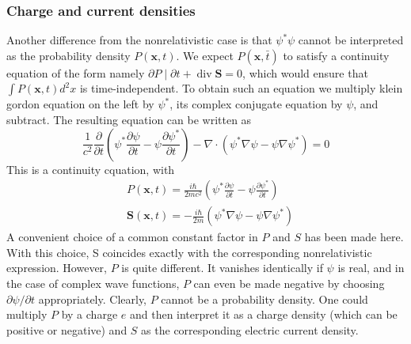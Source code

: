  \subsubsection{Charge and current densities}
 Another difference from the nonrelativistic case is that $\psi^{*} \psi$ cannot be interpreted as the probability density $P(\mathbf{x}, t) .$ We expect $P(\mathbf{x}, \bar{t})$ to satisfy a continuity equation of the form  namely $\partial P \mid \partial t+\operatorname{div} \mathbf{S}=0$, which would ensure that $\int P(\mathbf{x}, t) d^{2} x$ is time-independent. To obtain such an equation we multiply klein gordon equation on the left by $\psi^{*}$, its complex conjugate equation by $\psi$, and subtract.
 The resulting equation can be written as
 $$
 \frac{1}{c^{2}} \frac{\partial}{\partial t}\left(\psi^{*} \frac{\partial \psi}{\partial t}-\psi \frac{\partial \psi^{*}}{\partial t}\right)-\nabla \cdot\left(\psi^{*} \nabla \psi-\psi \nabla \psi^{*}\right)=0
 $$
 This is a continuity cquation, with
 $$
 \begin{aligned}
 &P(\mathbf{x}, t)=\frac{i \hbar}{2 m c^{2}}\left(\psi^{*} \frac{\partial \psi}{\partial t}-\psi \frac{\partial \psi^{*}}{\partial t}\right) \\
 &{\mathbf{S}(\mathbf{x}, t)=-\frac{i \hbar}{2 m}\left(\psi^{*} \nabla \psi-\psi \nabla \psi^{*}\right)}
 \end{aligned}
 $$
 A convenient choice of a common constant factor in $P$ and $S$ has been made here. With this choice, S coincides exactly with the corresponding nonrelativistic expression. However, $P$ is quite different. It vanishes identically if $\psi$ is real, and in the case of complex wave functions, $P$ can even be made negative by choosing $\partial \psi / \partial t$ appropriately. Clearly, $P$ cannot be a probability density. One could multiply $P$ by a charge $e$ and then interpret it as a charge density (which can be positive or negative) and $S$ as the corresponding electric current density.
